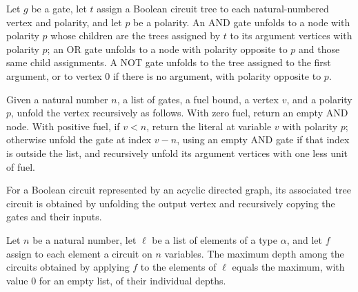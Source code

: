 \begin{definition}
\label{BoolCircuit.unfoldGate}
\leanok
{}
Let $g$ be a gate, let $t$ assign a Boolean circuit tree to each natural-numbered vertex
and polarity, and let $p$ be a polarity. An AND gate unfolds to a node with polarity $p$
whose children are the trees assigned by $t$ to its argument vertices with polarity $p$;
an OR gate unfolds to a node with polarity opposite to $p$ and those same child
assignments. A NOT gate unfolds to the tree assigned to the first argument, or to vertex
$0$ if there is no argument, with polarity opposite to $p$.
\end{definition}

\begin{definition}
\label{BoolCircuit.unfoldVertex}
\leanok
{}
Given a natural number $n$, a list of gates, a fuel bound, a vertex $v$, and a polarity
$p$, unfold the vertex recursively as follows. With zero fuel, return an empty AND node.
With positive fuel, if $v<n$, return the literal at variable $v$ with polarity $p$;
otherwise unfold the gate at index $v-n$, using an empty AND gate if that index is
outside the list, and recursively unfold its argument vertices with one less unit of
fuel.
\end{definition}

\begin{definition}
\label{BoolCircuit.DAGCircuit.toTree}
\leanok
{}
For a Boolean circuit represented by an acyclic directed graph, its associated tree
circuit is obtained by unfolding the output vertex and recursively copying the gates and
their inputs.
\end{definition}

\begin{theorem}
\label{BoolCircuit.maxDepth_map}
\leanok
{}
Let $n$ be a natural number, let $\ell$ be a list of elements of a type $\alpha$, and
let $f$ assign to each element a circuit on $n$ variables. The maximum depth among the
circuits obtained by applying $f$ to the elements of $\ell$ equals the maximum, with
value $0$ for an empty list, of their individual depths.
\end{theorem}

